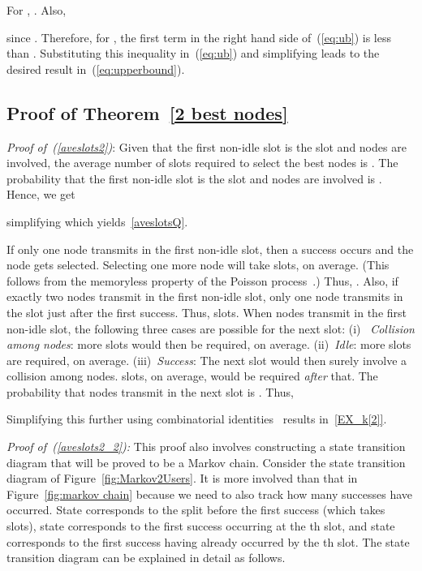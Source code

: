 \documentclass[12pt,draftcls,peerreview, onecolumn]{IEEEtran}
\newcommand{\eqn}[1]{(\ref{#1})}
\begin{document}
For , . Also,

since . Therefore, for , the first term in
the right hand side of~\eqn{eq:ub} is less than . Substituting this inequality in~\eqn{eq:ub} and
simplifying leads to the desired result in~\eqn{eq:upperbound}.




\subsection{Proof of Theorem~\ref{2 best nodes}}
\label{proof of 2 best nodes}

{\it Proof of~\eqn{aveslots2}}: Given that the first non-idle slot is
the  slot and  nodes are involved, the average number of
slots required to select the best  nodes is .  The
probability that the first non-idle slot is the  slot and
 nodes are involved is .  Hence, we get

simplifying which yields~\eqref{aveslotsQ}.

If only one node transmits in the first non-idle slot, then a success
occurs and the node gets selected. Selecting one more node will take
 slots, on average. (This follows from the
memoryless property of the Poisson process~\cite{wolff}.) Thus,
.  Also, if exactly two nodes
transmit in the first non-idle slot, only one node transmits in the
slot just after the first success. Thus, 
slots.  When  nodes transmit in the first non-idle slot, the
following three cases are possible for the next slot: (i)~{\it
  Collision among  nodes}:  more slots would then be
required, on average.  (ii)~{\it Idle}:  more slots are
required, on average. (iii)~{\it Success}: The next slot would then
surely involve a collision among  nodes.   slots,
on average, would be required {\it after} that.  The probability that
 nodes transmit in the next slot is . Thus,

Simplifying this further using combinatorial
identities~\cite{gradshteyn00_book} results in~\eqref{EX_k[2]}.


{\it Proof of~\eqn{aveslots2_2}:} This proof also involves
constructing a state transition diagram that will be proved to be a
Markov chain. Consider the state transition diagram of
Figure~\ref{fig:Markov2Users}. It is more involved than that in
Figure~\ref{fig:markov chain} because we need to also track how many
successes have occurred.  State  corresponds to the  split
before the first success (which takes  slots), state 
corresponds to the first success occurring at the th slot, and
state  corresponds to the first success having already occurred
by the th slot. The state transition diagram can be explained in
detail as follows.
\end{document}
